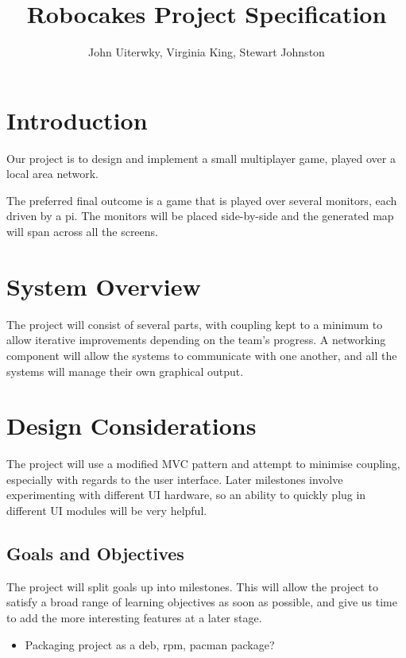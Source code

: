 \documentclass[a4paper]{article}
\begin{document}
\title{Robocakes Project Specification}
\author{John Uiterwky, Virginia King, Stewart Johnston}

\maketitle

\section{Introduction}

Our project is to design and implement a small multiplayer game, played over
a local area network.

The preferred final outcome is a game that is played over several monitors,
each driven by a pi. The monitors will be placed side-by-side and the
generated map will span across all the screens.

\section{System Overview}

The project will consist of several parts, with coupling kept to a minimum to
allow iterative improvements depending on the team's progress. A networking
component will allow the systems to communicate with one another, and all the
systems will manage their own graphical output.

\section{Design Considerations}

The project will use a modified MVC pattern and attempt to minimise coupling,
especially with regards to the user interface. Later milestones involve
experimenting with different UI hardware, so an ability to quickly plug in
different UI modules will be very helpful.

\subsection{Goals and Objectives}

The project will split goals up into milestones. This will allow the project
to satisfy a broad range of learning objectives as soon as possible, and give
us time to add the more interesting features at a later stage.

\begin{itemize}
  \item Packaging project as a deb, rpm, pacman package?
\end{itemize}
\end{document}
